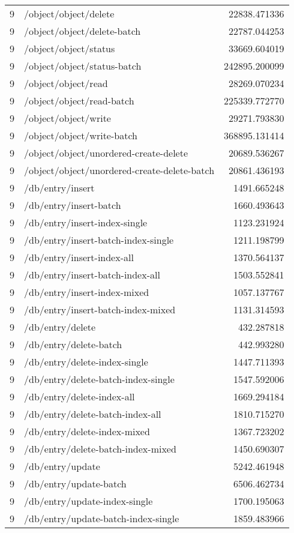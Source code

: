 \begin{longtable}{rlr}
9 & /object/object/delete & 22838.471336 \\
9 & /object/object/delete-batch & 22787.044253 \\
9 & /object/object/status & 33669.604019 \\
9 & /object/object/status-batch & 242895.200099 \\
9 & /object/object/read & 28269.070234 \\
9 & /object/object/read-batch & 225339.772770 \\
9 & /object/object/write & 29271.793830 \\
9 & /object/object/write-batch & 368895.131414 \\
9 & /object/object/unordered-create-delete & 20689.536267 \\
9 & /object/object/unordered-create-delete-batch & 20861.436193 \\
9 & /db/entry/insert & 1491.665248 \\
9 & /db/entry/insert-batch & 1660.493643 \\
9 & /db/entry/insert-index-single & 1123.231924 \\
9 & /db/entry/insert-batch-index-single & 1211.198799 \\
9 & /db/entry/insert-index-all & 1370.564137 \\
9 & /db/entry/insert-batch-index-all & 1503.552841 \\
9 & /db/entry/insert-index-mixed & 1057.137767 \\
9 & /db/entry/insert-batch-index-mixed & 1131.314593 \\
9 & /db/entry/delete & 432.287818 \\
9 & /db/entry/delete-batch & 442.993280 \\
9 & /db/entry/delete-index-single & 1447.711393 \\
9 & /db/entry/delete-batch-index-single & 1547.592006 \\
9 & /db/entry/delete-index-all & 1669.294184 \\
9 & /db/entry/delete-batch-index-all & 1810.715270 \\
9 & /db/entry/delete-index-mixed & 1367.723202 \\
9 & /db/entry/delete-batch-index-mixed & 1450.690307 \\
9 & /db/entry/update & 5242.461948 \\
9 & /db/entry/update-batch & 6506.462734 \\
9 & /db/entry/update-index-single & 1700.195063 \\
9 & /db/entry/update-batch-index-single & 1859.483966 \\

\end{longtable}
